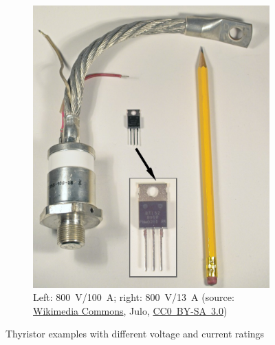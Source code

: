 \begin{frame}[b]
\begin{figure}
\begin{subfigure}{0.45\textwidth}
            \includegraphics[height=0.45\textheight]{fig/lec05/Thyristor_example_02.jpg}
			\caption{Left: \SI{800}{\volt}/\SI{100}{\ampere}; right: \SI{800}{\volt}/\SI{13}{\ampere} (source: \href{https://de.wikipedia.org/wiki/Datei:Thyristors_thyristoren.jpg}{Wikimedia Commons}, Julo, \href{https://creativecommons.org/licenses/by-sa/3.0/deed.de}{CC0~BY-SA~3.0})}
            \vspace{1em}
        \end{subfigure}
        \caption{Thyristor examples with different voltage and current ratings}
        \label{fig:thyristor_examples}
    \end{figure}
\end{frame}

